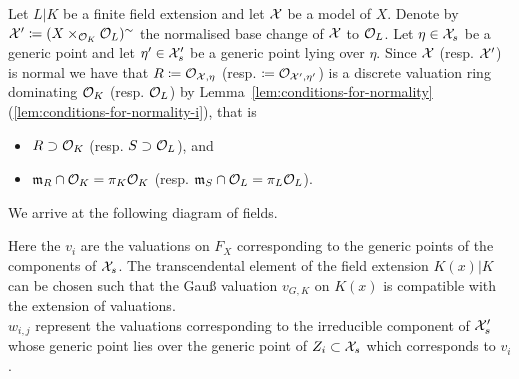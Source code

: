 Let $L|K$ be a finite field extension and let $\mathcal X$ be a model of $X$.
Denote by $\mathcal X' \coloneqq (X\times_{\mathcal O_K} \mathcal O_L)^\sim$ the normalised base change of $\mathcal X$ to $\mathcal O_L$.
Let $\eta \in \mathcal X_s$ be a generic point and let $\eta' \in \mathcal X_s'$ be a generic point lying over $\eta$.
Since $\mathcal X$ (resp. $\mathcal X'$) is normal we have that $R \coloneqq \mathcal{O}_{\mathcal X, \eta}$ (resp. $ \coloneqq \mathcal{O}_{\mathcal X', \eta'}$)
is a discrete valuation ring dominating $\mathcal O_K$ (resp. $\mathcal O_L$) by
Lemma~\ref{lem:conditions-for-normality} (\ref{lem:conditions-for-normality-i}), that is
\begin{itemize}
    \item $R \supset \mathcal{O}_K$ (resp. $S \supset \mathcal O_L$), and
    \item $\mathfrak m_R \cap \mathcal O_K = \pi_K\mathcal O_K$ (resp. $\mathfrak m_S \cap \mathcal O_L = \pi_L\mathcal O_L$).
\end{itemize}
We arrive at the following diagram of fields.


\begin{figure}[H]\label{fig:valuations-and-field-extensions}
    \centering
\end{figure}

Here the $v_i$ are the valuations on $F_X$ corresponding to the generic points of the components of $\mathcal X_s$.
The transcendental element of the field extension $K(x)|K$ can be chosen such that the Gauß valuation $v_{{\scriptscriptstyle G}, K}$
on $K(x)$ is compatible with the extension of valuations. \\
$w_{i, j}$ represent the valuations corresponding to the irreducible component of $\mathcal X_s'$ whose generic point lies over
the generic point of $Z_i \subset \mathcal X_s$ which corresponds to $v_i$.

